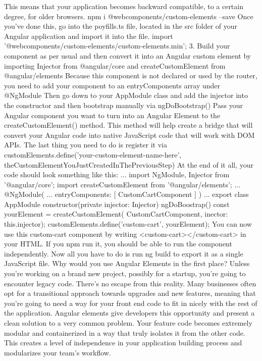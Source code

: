 This means that your application becomes backward compatible, to a certain degree, for older browsers. 
npm i @webcomponents/custom-elements --save
Once you’ve done this, go into the poyfills.ts file, located in the src folder of your Angular application and import it into the file.
import '@webcomponents/custom-elements/custom-elements.min';
3. Build your component as per usual and then convert it into an Angular custom element by importing Injector from @angular/core and createCustomElement from @angular/elements 
Because this component is not declared or used by the router, you need to add your component to an entryComponents array under @NgModule
Then go down to your AppModule class and add the injector into the constructor and then bootstrap manually via ngDoBootstrap()
Pass your Angular component you want to turn into an Angular Element to the createCustomElement() method. This method will help create a bridge that will convert your Angular code into native JavaScript code that will work with DOM APIs. 
The last thing you need to do is register it via customElements.define('your-custom-element-name-here', theCustomElementYouJustCreatedInThePreviousStep)
At the end of it all, your code should look something like this:
...
import {NgModule, Injector } from '@angular/core';
import {createCustomElement} from '@angular/elements';
...
@NgModule({
...
entryComponents: [ CustomCartComponent ]
})
...
export class AppModule {
constructor(private injector: Injector){}
ngDoBoostrap(){
    const yourElement = createCustomElement( CustomCartComponent, { inector: this.injector});
    customElements.define('custom-cart', yourElement);
 }
}
You can now use this custom-cart component by writing <custom-cart></custom-cart> in your HTML. If you npm run it, you should be able to run the component independently. 
Now all you have to do is run ng build to export it as a single JavaScript file. 
Why would you use Angular Elements in the first place?
Unless you’re working on a brand new project, possibly for a startup, you’re going to encounter legacy code. There’s no escape from this reality. 
Many businesses often opt for a transitional approach towards upgrades and new features, meaning that you’re going to need a way for your front end code to fit in nicely with the rest of the application.
Angular elements give developers this opportunity and present a clean solution to a very common problem. Your feature code becomes extremely modular and containerized in a way that truly isolates it from the other code.
This creates a level of independence in your application building process and modularizes your team’s workflow. 
